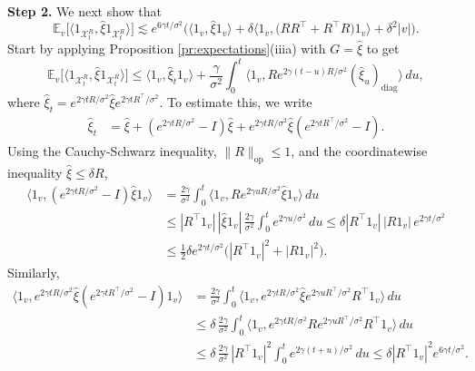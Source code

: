 \documentclass[11pt,reqno]{amsart}
\numberwithin{equation}{section}
\theoremstyle{definition}
\def\E{{\mathbb E}}
\def\X{{\mathcal X}}
\begin{document}
{ \ }

\noindent\textbf{Step 2.}
We next show that
\begin{equation}
	\E_v\big[  \langle 1_{\X_t^{R}}, \widehat{\xi} 1_{\X_t^{R}}\rangle  \big] \lesssim e^{6\gamma t/\sigma^2}\Big(\langle 1_v,\widehat{\xi}  1_v\rangle + \delta \big\langle 1_v,\big(RR^\top + R^\top R\big) 1_v \big\rangle + \delta^2|v|\Big). \label{pf:setwise-exp2}
\end{equation}
Start by applying Proposition \ref{pr:expectations}(iiia) with $G=\widehat{\xi}$ to get
\begin{equation}
	\E_v\big[  \langle 1_{\X_t^{R}}, \widehat{\xi} 1_{\X_t^{R}}\rangle  \big] \le \langle 1_v,\widehat{\xi}_t 1_v\rangle + \frac{\gamma}{\sigma^2} \int_0^t  \Big\langle 1_v, R e^{2\gamma (t-u)R/\sigma^2} (\widehat{\xi}_u)_{\mathrm{diag}}\Big\rangle \,du, \label{pf:setwise-**}
\end{equation}
where $\widehat{\xi}_t = e^{2\gamma t R/\sigma^2}\widehat{\xi}e^{2\gamma t R^\top/\sigma^2}$. 
To estimate this, we write
\begin{align*}
	\widehat{\xi}_t &= \widehat{\xi} + (e^{2\gamma t R/\sigma^2}-I)\widehat{\xi} +  e^{2\gamma t R/\sigma^2} \widehat{\xi}(e^{2\gamma t R^\top/\sigma^2}-I).
\end{align*}
Using the Cauchy-Schwarz inequality, $\|R\|_{\mathrm{op}} \le 1$, and the coordinatewise inequality $\widehat{\xi} \le \delta R$, 
\begin{align*}
	\langle 1_v,(e^{2\gamma t R/\sigma^2}-I)\widehat{\xi} 1_v\rangle
	&= \frac{2\gamma}{\sigma^2} \int_0^{ t} \langle 1_v, R e^{2\gamma u R/\sigma^2} \widehat{\xi} 1_v\rangle\,du \\
	&\le |R^\top 1_v|\,| \widehat{\xi} 1_v|\, \frac{2\gamma}{\sigma^2} \int_0^t  e^{2\gamma u/\sigma^2}\,du
	\le \delta |R^\top 1_v|\,| R 1_v|\, e^{2\gamma t/\sigma^2} \\
	&\le \frac12 \delta e^{2\gamma t/\sigma^2}\big(|R^\top 1_v|^2+  |  R  1_v|^2\big).
\end{align*}
Similarly,
\begin{align*}
	\langle 1_v,e^{2\gamma t R/\sigma^2} \widehat{\xi}(e^{2\gamma t R^\top/\sigma^2}-I) 1_v\rangle
	&= \frac{2\gamma}{\sigma^2} \int_0^{ t} \langle 1_v,e^{2\gamma t R/\sigma^2} \widehat{\xi} e^{2\gamma u R^\top/\sigma^2} R^\top1_v\rangle\,du \\
	&\le \delta\, \frac{2\gamma}{\sigma^2} \int_0^{ t} \langle 1_v,e^{2\gamma t R/\sigma^2}  R  e^{2\gamma u R^\top/\sigma^2} R^\top1_v\rangle\,du \\
	&\le  \delta\, \frac{2\gamma}{\sigma^2}\, |R^\top 1_v|^2\int_0^t  e^{2\gamma (t+u)/\sigma^2}\,du  
	\le   \delta |R^\top 1_v|^2 e^{6\gamma t/\sigma^2} . 
\end{align*}
\end{document}
